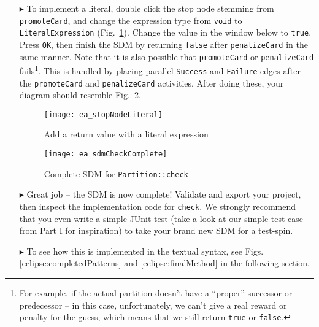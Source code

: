 \begin{itemize}
\item[$\blacktriangleright$] To implement a literal, double click the stop node stemming from  \texttt{promoteCard}, and change the expression type from
\texttt{void} to \texttt{LiteralEx\-pression} (Fig.~\ref{ea:sdm_check_literal_exp}). Change the value in the window below to \texttt{true}. Press \texttt{OK},
then finish the SDM by returning \texttt{false} after \texttt{penalizeCard} in the same manner. Note that it is also possible that \texttt{promoteCard} or 
\texttt{penalizeCard} fails\footnote{For example, if the actual partition doesn't have a ``proper'' successor or predecessor -- in this case, unfortunately, we can't 
give a real reward or penalty for the guess, which means that we still return \texttt{true} or \texttt{false}.}. This is handled by placing parallel \texttt{Success} 
and \texttt{Failure} edges after the \texttt{promoteCard} and \texttt{penalizeCard} activities. After doing these, your diagram should 
resemble Fig.~\ref{ea:sdm_check_finish}.

\begin{figure}[htbp]
\begin{center}
  \texttt{[image: ea\_stopNodeLiteral]}
  \caption{Add a return value with a literal expression}
  \label{ea:sdm_check_literal_exp}
\end{center}
\end{figure}

\begin{figure}[htbp]
\begin{center}
  \texttt{[image: ea\_sdmCheckComplete]}
  \caption{Complete SDM for \texttt{Partition::check}}
  \label{ea:sdm_check_finish}
\end{center}
\end{figure}

\clearpage

\item[$\blacktriangleright$] Great job -- the SDM is now complete! Validate and export your project, then inspect the implementation code for \texttt{check}. We
strongly recommend that you even write a simple JUnit test (take a look at our simple test case from Part I for inspiration) to take your brand new SDM for a
test-spin.

\item[$\blacktriangleright$] To see how this is implemented in the textual syntax, see Figs. \ref{eclipse:completedPatterns} and \ref{eclipse:finalMethod} in
the following section.


\end{itemize}
